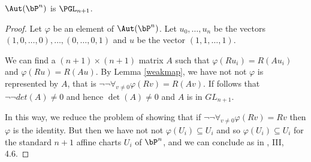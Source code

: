 \begin{corollary}
    $\Aut(\bP^n)$ is $\PGL_{n+1}$.
\end{corollary}

\begin{proof}
  Let $\varphi$ be an element of $\Aut(\bP^n)$.
  Let $u_0,\dots,u_n$ be the vectors $(1,0,\dots,0), \dots, (0,\dots,0,1)$
  and $u$ be the vector $(1,1,\dots,1)$.

  We can find a $(n+1)\times (n+1)$ matrix $A$ such that $\varphi(R u_i) = R (Au_i)$
  and $\varphi(R u) = R (A u)$. By Lemma \ref{weakmap}, we have not not $\varphi$ is represented by $A$,
  that is $\neg\neg \forall_{v\neq 0}\varphi(R v) = R (Av)$. If follows that $\neg \neg det(A) \neq 0$
  and hence $\det(A)\neq 0$ and $A$ is in $GL_{n+1}$.

  In this way, we reduce the problem of showing that if $\neg\neg \forall_{v\neq 0}\varphi (R v) = R v$
  then $\varphi$ is the identity. But then we have not not $\varphi(U_i)\subseteq U_i$
  and so $\varphi(U_i)\subseteq U_i$ for the standard $n+1$ affine charts $U_i$ of $\bP^n$, and we can
  conclude as in \cite{Demazure}, III, 4.6.
\end{proof}
